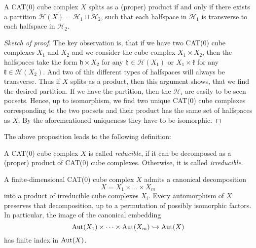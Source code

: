 \begin{prop}
  A CAT(0) cube complex \(X\) splits as a (proper) product if and only if  there  exists a partition \(\mathcal{H}(X) = \mathcal{H}_1 \sqcup \mathcal{H}_2\), such that each halfspace in \(\mathcal{H}_1\) is transverse to each halfspace in \(\mathcal{H}_2\).
\end{prop}

\begin{proof}[Sketch of proof]
  The key observation is, that if we have two CAT(0) cube complexes \(X_1\) and \(X_2\) and we consider the cube complex \(X_1 \times X_2\), then the halfspaces take the form \(\mathfrak{h} \times X_2\) for any \(\mathfrak{h} \in \mathcal{H}(X_1)\) or \(X_1 \times \mathfrak{k}\) for any \(\mathfrak{k} \in \mathcal{H}(X_2)\). And two of this different types of halfspaces will always be transverse. Thus if \(X\) splits as a product, then this argument shows, that we find the desired partition. If we have the partition, then the \(\mathcal{H}_i\) are easily to be seen pocsets. Hence, up to isomorphism, we find two unique CAT(0) cube complexes corresponding to the two pocsets and their product has the same set of halfspaces as \(X\). By the aforementioned uniqueness they have to be isomorphic.
\end{proof}

The above proposition leads to the following definition:

\begin{defin}
  A CAT(0) cube complex \(X\) is called \emph{reducible}, if it can be decomposed as a (proper) product of CAT(0) cube complexes. Otherwise, it is called \emph{irreducible}.
\end{defin}

\begin{prop}
  \label{prop:cs-2.6}
  A finite-dimensional CAT(0) cube complex \(X\) admits a canonical decomposition
  \[
    X = X_1 \times \dots \times X_m
  \]
  into a product of irreducible cube complexes \(X_i\). Every automorphism of \(X\) preserves that decomposition, up to a permutation of possibly isomorphic factors. In particular, the image of the canonical embedding
  \[
    \operatorname{Aut}(X_1) \times \dots \times \operatorname{Aut}(X_m) \hookrightarrow \operatorname{Aut}(X)
  \]
  has finite index in \(\operatorname{Aut}(X)\).
\end{prop}

